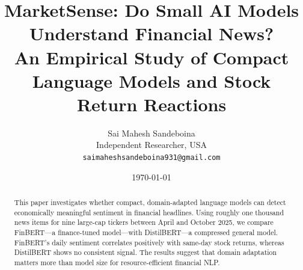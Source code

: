 \documentclass[10pt]{article}
\title{MarketSense: Do Small AI Models Understand Financial News?\\
\vspace{0.25em}\large An Empirical Study of Compact Language Models and Stock Return Reactions}
\author{Sai Mahesh Sandeboina\\Independent Researcher, USA\\\texttt{saimaheshsandeboina931@gmail.com}}
\date{\today}
\begin{document}
\maketitle

\begin{abstract}
This paper investigates whether compact, domain-adapted language models can detect economically meaningful sentiment in financial headlines. Using roughly one thousand news items for nine large-cap tickers between April and October 2025, we compare FinBERT—a finance-tuned model—with DistilBERT—a compressed general model. FinBERT’s daily sentiment correlates positively with same-day stock returns, whereas DistilBERT shows no consistent signal. The results suggest that domain adaptation matters more than model size for resource-efficient financial NLP.
\end{abstract}






\small


\end{document}
